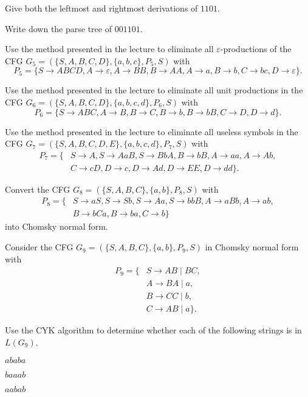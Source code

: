 \documentclass{exercise}
\begin{document}
\subtask Give both the leftmost and rightmost derivations of $1101$.


\subtask Write down the parse tree of $001101$.



\subtask Use the method presented in the lecture to eliminate all $\varepsilon$-productions
 of the CFG $G_5=(\{S,A,B,C,D\},\{a,b,c\},P_5,S)$ with
 \[ P_5 = \{ S\to ABCD, A\to\varepsilon, A\to BB, B\to AA, A\to a, B\to b, C\to bc, D\to \varepsilon\}. \]


\subtask Use the method presented in the lecture to eliminate all unit productions in
  the CFG $G_6=(\{S,A,B,C,D\},\{a,b,c,d\},P_6,S)$ with
  \[ P_6 =\{ S\to ABC, A\to B, B\to C, B\to b, B\to bB, C\to D, D\to d\}. \]


\subtask Use the method presented in the lecture to eliminate all useless symbols in
  the CFG $G_7=(\{S,A,B,C,D,E\},\{a,b,c,d\},P_7,S)$ with
  \begin{align*}
     P_7 =\{ & S\to A, S\to AaB, S\to BbA, B\to bB, A\to aa, A\to Ab,\\
             & C\to cD, D\to c, D\to Ad, D\to EE, D\to dd\}.
  \end{align*}


\subtask Convert the CFG $G_8=(\{S,A,B,C\},\{a,b\},P_8,S)$ with
  \begin{align*}
    P_8 = \{ & S\to aS, S\to Sb, S\to Aa, S\to bbB, A\to aBb, A\to ab,\\
             & B\to bCa, B\to ba, C\to b\}
  \end{align*}
  into Chomsky normal form.



Consider the CFG $G_9=(\{S,A,B,C\},\{a,b\},P_9,S)$ in Chomsky normal form with
\begin{align*}
  P_9 = \{ & S \to AB \mid BC,\\
           & A \to BA \mid a,\\
           & B \to CC \mid b,\\
           & C \to AB \mid a\}.
\end{align*}

Use the CYK algorithm to determine whether each of the following strings is in $L(G_9)$.
  
\subtask $ababa$
 

\subtask $baaab$
  

\subtask $aabab$

\end{document}
